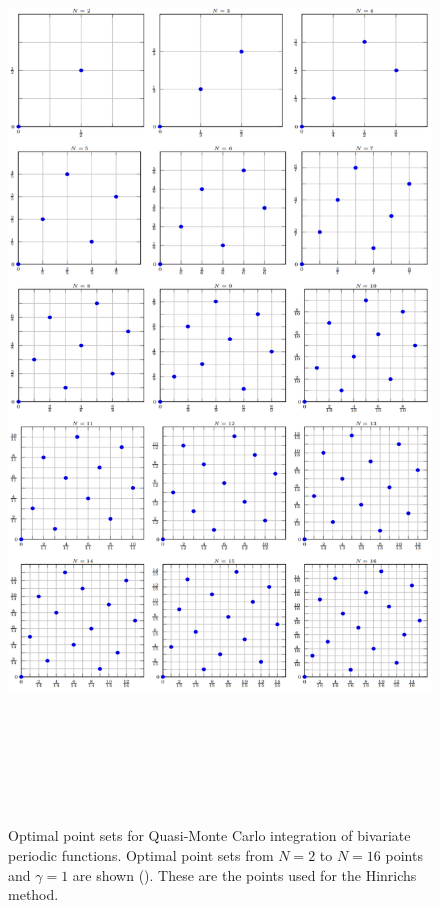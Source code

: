 \begin{figure}[h!]
  \begin{center}
    \includegraphics[width=160mm, height=250mm]{Figuras/Hinrichs.png}\par
    \caption{Optimal point sets for Quasi-Monte Carlo integration of bivariate periodic functions. Optimal point sets from $N=2$ to $N=16$ points and $\gamma = 1$ are shown (\cite{Hinrichs.pdf}). These are the points used for the Hinrichs method.}
    \label{fig:Hinrichs}
  \end{center}
\end{figure}




